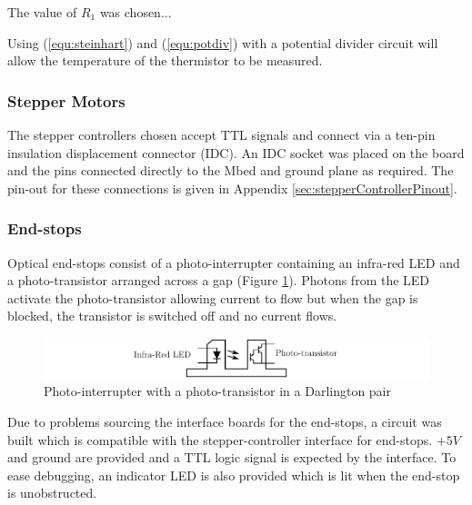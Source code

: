 				
				The value of $R_1$ was chosen...
				
				Using (\ref{equ:steinhart}) and (\ref{equ:potdiv}) with a potential
				divider circuit will allow the temperature of the thermistor to be
				measured.
				
			
			\subsubsection{Stepper Motors}
				
				The stepper controllers chosen accept TTL signals and connect via a
				ten-pin insulation displacement connector (IDC). An IDC socket was
				placed on the board and the pins connected directly to the Mbed and
				ground plane as required. The pin-out for these connections is given in
				Appendix \ref{sec:stepperControllerPinout}.
				
			
			\subsubsection{End-stops}
				
				Optical end-stops consist of a photo-interrupter containing an infra-red
				LED and a photo-transistor arranged across a gap (Figure
				\ref{fig:endstop}). Photons from the LED activate the photo-transistor
				allowing current to flow but when the gap is blocked, the transistor is
				switched off and no current flows.
				
				\begin{figure}
					\includegraphics[width=1\textwidth]{diagrams/endstop.pdf}
					\caption{Photo-interrupter with a photo-transistor in a Darlington pair}
					\label{fig:endstop}
				\end{figure}
				
				Due to problems sourcing the interface boards for the end-stops, a
				circuit was built which is compatible with the stepper-controller
				interface for end-stops. $+5V$ and ground are provided and a TTL logic
				signal is expected by the interface. To ease debugging, an indicator LED
				is also provided which is lit when the end-stop is unobstructed.
				
